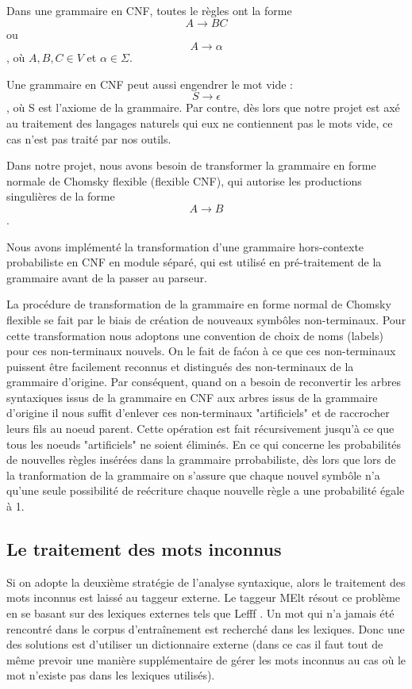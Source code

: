 \documentclass[12pt]{article}
\begin{document}
Dans une grammaire en
CNF, toutes le r\`egles ont la forme $$A \rightarrow BC$$ ou $$A \rightarrow
\alpha$$, o\`u $A,B,C \in V$ et $\alpha \in \Sigma$. \par

Une grammaire en CNF peut
aussi engendrer le mot vide : $$S \rightarrow \epsilon$$, o\`u S est l'axiome de
la grammaire. Par contre, d\`es lors que notre projet est ax\'e au traitement des langages naturels
qui eux ne contiennent pas le mots vide, ce cas n'est pas trait\'e par nos outils.

Dans notre projet, nous avons besoin de transformer la grammaire en forme
normale de Chomsky flexible (flexible CNF), qui autorise les productions
singuli\`eres de la forme $$A \rightarrow B$$. \par

Nous avons impl\'ement\'e la transformation d'une grammaire hors-contexte probabiliste en CNF en
module s\'epar\'e, qui est utilis\'e en pr\'e-traitement de la grammaire avant
de la passer au parseur.

La proc\'edure de transformation de la grammaire en forme normal de Chomsky flexible
se fait par le biais de cr\'eation de nouveaux symb\^oles non-terminaux.
Pour cette transformation nous adoptons une convention de choix de noms (labels) pour ces non-terminaux
nouvels. On le fait de fa\'con \`a ce que ces non-terminaux puissent \^etre facilement reconnus et
distingu\'es des non-terminaux de la grammaire d'origine. Par cons\'equent, quand on a besoin de reconvertir
les arbres syntaxiques issus de la grammaire en CNF aux arbres issus de la grammaire d'origine il nous suffit
d'enlever ces non-terminaux "artificiels" et de raccrocher leurs fils au noeud parent. Cette op\'eration est
fait r\'ecursivement jusqu'\`a ce que tous les noeuds "artificiels" ne soient \'elimin\'es.
En ce qui concerne les probabilit\'es de nouvelles r\`egles ins\'er\'ees dans la grammaire prrobabiliste,
d\`es lors que lors de la tranformation de la grammaire on s'assure que chaque nouvel symb\^ole n'a qu'une
seule possibilit\'e de re\'ecriture chaque nouvelle r\`egle a une probabilit\'e \'egale \`a 1.

\subsection{Le traitement des mots inconnus}

Si on adopte la deuxi\`eme strat\'egie de l'analyse syntaxique, alors le
traitement des mots inconnus est laiss\'e au taggeur externe.
Le taggeur MElt r\'esout ce probl\`eme en se basant sur des lexiques externes tels
que Lefff \cite{Lefff}. Un mot qui n'a jamais \'et\'e rencontr\'e dans le corpus
d'entra\^inement est recherch\'e dans les lexiques. Donc une des solutions est
d'utiliser un dictionnaire externe (dans ce cas il faut tout de m\^eme prevoir
une mani\`ere suppl\'ementaire de g\'erer les mots inconnus au cas o\`u le mot n'existe
pas dans les lexiques utilis\'es).\par
\end{document}
